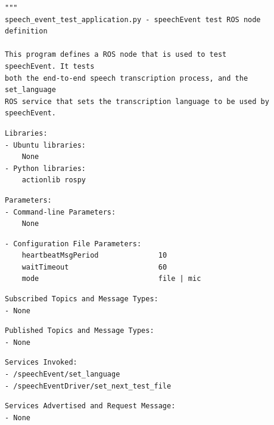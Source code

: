 \documentclass{CSSRforAfrica}
\newcommand{\checkboxChecked}{\fbox{\ding{51}}} %
\begin{document}
\begin{description}

\item[\checkboxChecked] 
 {\small 
\begin{verbatim}
"""
speech_event_test_application.py - speechEvent test ROS node definition

This program defines a ROS node that is used to test speechEvent. It tests
both the end-to-end speech transcription process, and the set_language
ROS service that sets the transcription language to be used by speechEvent.

\end{verbatim}}

\item[\checkboxChecked] 
 {\small 
\begin{verbatim}
Libraries:
- Ubuntu libraries:
    None
- Python libraries:
    actionlib rospy
\end{verbatim}}

\item[\checkboxChecked] 
 {\small 
\begin{verbatim}
Parameters:
- Command-line Parameters:
    None
\end{verbatim}}

\item[\checkboxChecked] 
 {\small 
\begin{verbatim}
- Configuration File Parameters:
    heartbeatMsgPeriod              10
    waitTimeout                     60
    mode                            file | mic
\end{verbatim}}

\item[\checkboxChecked] 
 {\small 
\begin{verbatim}
Subscribed Topics and Message Types:
- None
\end{verbatim}}

\item[\checkboxChecked] 
 {\small 
\begin{verbatim}
Published Topics and Message Types:
- None
\end{verbatim}}

\item[\checkboxChecked] 
 {\small 
\begin{verbatim}
Services Invoked:
- /speechEvent/set_language
- /speechEventDriver/set_next_test_file
\end{verbatim}}

\item[\checkboxChecked] 
 {\small 
\begin{verbatim}
Services Advertised and Request Message:
- None
\end{verbatim}}


\end{description}
\end{document}
